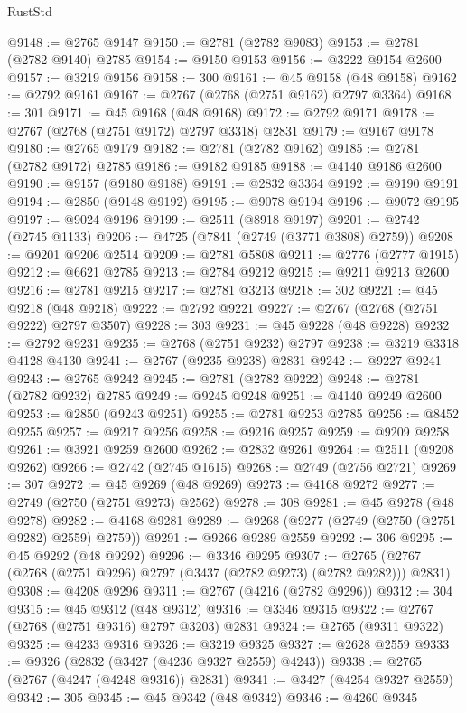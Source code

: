 \begin{lexlean}{RustStd}
\begin{coremodule}
@9148 := @2765 @9147
@9150 := @2781 (@2782 @9083)
@9153 := @2781 (@2782 @9140) @2785
@9154 := @9150 @9153
@9156 := @3222 @9154 @2600
@9157 := @3219 @9156
@9158 := 300
@9161 := @45 @9158 (@48 @9158)
@9162 := @2792 @9161
@9167 := @2767 (@2768 (@2751 @9162) @2797 @3364)
@9168 := 301
@9171 := @45 @9168 (@48 @9168)
@9172 := @2792 @9171
@9178 := @2767 (@2768 (@2751 @9172) @2797 @3318) @2831
@9179 := @9167 @9178
@9180 := @2765 @9179
@9182 := @2781 (@2782 @9162)
@9185 := @2781 (@2782 @9172) @2785
@9186 := @9182 @9185
@9188 := @4140 @9186 @2600
@9190 := @9157 (@9180 @9188)
@9191 := @2832 @3364
@9192 := @9190 @9191
@9194 := @2850 (@9148 @9192)
@9195 := @9078 @9194
@9196 := @9072 @9195
@9197 := @9024 @9196
@9199 := @2511 (@8918 @9197)
@9201 := @2742 (@2745 @1133)
@9206 := @4725 (@7841 (@2749 (@3771 @3808) @2759))
@9208 := @9201 @9206 @2514
@9209 := @2781 @5808
@9211 := @2776 (@2777 @1915)
@9212 := @6621 @2785
@9213 := @2784 @9212
@9215 := @9211 @9213 @2600
@9216 := @2781 @9215
@9217 := @2781 @3213
@9218 := 302
@9221 := @45 @9218 (@48 @9218)
@9222 := @2792 @9221
@9227 := @2767 (@2768 (@2751 @9222) @2797 @3507)
@9228 := 303
@9231 := @45 @9228 (@48 @9228)
@9232 := @2792 @9231
@9235 := @2768 (@2751 @9232) @2797
@9238 := @3219 @3318 @4128 @4130
@9241 := @2767 (@9235 @9238) @2831
@9242 := @9227 @9241
@9243 := @2765 @9242
@9245 := @2781 (@2782 @9222)
@9248 := @2781 (@2782 @9232) @2785
@9249 := @9245 @9248
@9251 := @4140 @9249 @2600
@9253 := @2850 (@9243 @9251)
@9255 := @2781 @9253 @2785
@9256 := @8452 @9255
@9257 := @9217 @9256
@9258 := @9216 @9257
@9259 := @9209 @9258
@9261 := @3921 @9259 @2600
@9262 := @2832 @9261
@9264 := @2511 (@9208 @9262)
@9266 := @2742 (@2745 @1615)
@9268 := @2749 (@2756 @2721)
@9269 := 307
@9272 := @45 @9269 (@48 @9269)
@9273 := @4168 @9272
@9277 := @2749 (@2750 (@2751 @9273) @2562)
@9278 := 308
@9281 := @45 @9278 (@48 @9278)
@9282 := @4168 @9281
@9289 := @9268 (@9277 (@2749 (@2750 (@2751 @9282) @2559) @2759))
@9291 := @9266 @9289 @2559
@9292 := 306
@9295 := @45 @9292 (@48 @9292)
@9296 := @3346 @9295
@9307 := @2765 (@2767 (@2768 (@2751 @9296) @2797 (@3437 (@2782 @9273) (@2782 @9282))) @2831)
@9308 := @4208 @9296
@9311 := @2767 (@4216 (@2782 @9296))
@9312 := 304
@9315 := @45 @9312 (@48 @9312)
@9316 := @3346 @9315
@9322 := @2767 (@2768 (@2751 @9316) @2797 @3203) @2831
@9324 := @2765 (@9311 @9322)
@9325 := @4233 @9316
@9326 := @3219 @9325
@9327 := @2628 @2559
@9333 := @9326 (@2832 (@3427 (@4236 @9327 @2559) @4243))
@9338 := @2765 (@2767 (@4247 (@4248 @9316)) @2831)
@9341 := @3427 (@4254 @9327 @2559)
@9342 := 305
@9345 := @45 @9342 (@48 @9342)
@9346 := @4260 @9345

\end{coremodule}
\end{lexlean}
